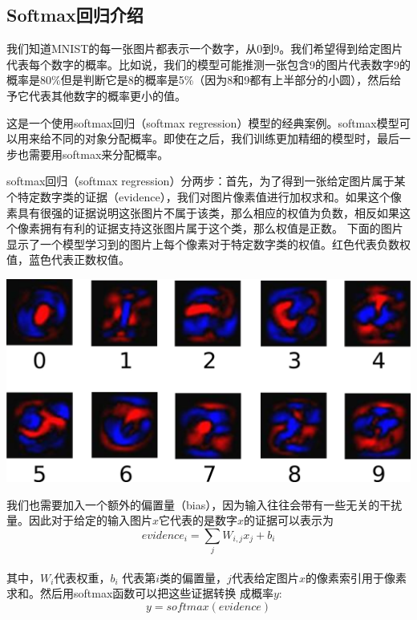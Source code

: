 \documentclass[a4paper,11pt,twoside]{ctexbook}
\begin{document}
\subsection {Softmax回归介绍}

我们知道MNIST的每一张图片都表示一个数字，从0到9。我们希望得到给定图片代表每个数字的概率。比如说，我们的模型可能推测一张包含9的图片代表数字9的概率是80\%但是判断它是8的概率是5\%（因为8和9都有上半部分的小圆），然后给予它代表其他数字的概率更小的值。

这是一个使用softmax回归（softmax regression）模型的经典案例。softmax模型可以用来给不同的对象分配概率。即使在之后，我们训练更加精细的模型时，最后一步也需要用softmax来分配概率。

softmax回归（softmax regression）分两步：首先，为了得到一张给定图片属于某个特定数字类的证据（evidence），我们对图片像素值进行加权求和。如果这个像素具有很强的证据说明这张图片不属于该类，那么相应的权值为负数，相反如果这个像素拥有有利的证据支持这张图片属于这个类，那么权值是正数。
下面的图片显示了一个模型学习到的图片上每个像素对于特定数字类的权值。红色代表负数权值，蓝色代表正数权值。


\begin{center}
\includegraphics[width=.7\textwidth]{../SOURCE/images/softmax-weights.png}
\end{center}

我们也需要加入一个额外的偏置量（bias），因为输入往往会带有一些无关的干扰量。因此对于给定的输入图片$x$它代表的是数字$x$的证据可以表示为\\
\begin{equation}
evidence_i = \sum_j{W_{i,j}}x_j+b_i
\end{equation}\\
其中，$W_i$代表权重，$b_i$ 代表第$i$类的偏置量，$j$代表给定图片$x$的像素索引用于像素求和。然后用softmax函数可以把这些证据转换
成概率$y$:\\
\begin{equation}
y = softmax(evidence)
\end{equation}
\end{document}
